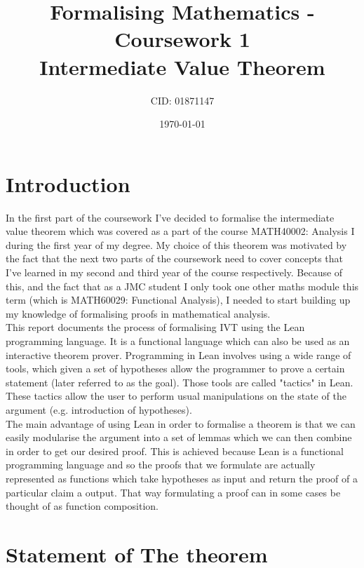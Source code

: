 \documentclass[11pt]{article}
\begin{document}
\title{Formalising Mathematics - Coursework 1 \\ Intermediate Value Theorem}
\date{\today}
\author{CID: 01871147}
\maketitle

\section*{ Introduction }

In the first part of the coursework I've decided to formalise the intermediate
value theorem which was covered as a part of the course MATH40002: Analysis I
during the first year of my degree. My choice of this theorem was motivated by
the fact that the next two parts of the coursework need to cover concepts that
I've learned in my second and third year of the course respectively. Because of
this, and the fact that as a JMC student I only took one other maths module this
term (which is MATH60029: Functional Analysis), I needed to start building up my
knowledge of formalising proofs in mathematical analysis. \\

This report documents the process of formalising IVT using the Lean programming
language. It is a functional language which can also be used as an interactive
theorem prover. Programming in Lean involves using a wide range of tools, which
given a set of hypotheses allow the programmer to prove a certain statement
(later referred to as the goal). Those tools are called "tactics" in Lean.
These tactics allow the user to perform usual manipulations on the state of the
argument (e.g. introduction of hypotheses). \\

The main advantage of using Lean in order to formalise a theorem is that we can
easily modularise the argument into a set of lemmas which we can then combine
in order to get our desired proof. This is achieved because Lean is a
functional programming language and so the proofs that we formulate are
actually represented as functions which take hypotheses as input and return the
proof of a particular claim a output. That way formulating a proof can in some
cases be thought of as function composition.

\pagebreak

\section*{ Statement of The theorem }
\end{document}
